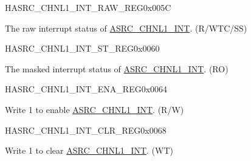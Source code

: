 \begin{register}{H}{ASRC\_CHNL1\_INT\_RAW\_REG}{0x005C}\label{regdesc:ASRCCHNL1INTRAWREG}
%
%
\regnewline%
\begin{regdesc}\begin{reglist}
\label{fielddesc:ASRCCHNL1OUTCNTEOFINTRAW}\item [ASRC\_CHNL1\_OUTCNT\_EOF\_INT\_RAW] The raw interrupt status of \hyperref[int:ASRCCHNL1INT] {ASRC\_CHNL1\_INT}. (R/WTC/SS)
\end{reglist}\end{regdesc}
\end{register}


\begin{register}{H}{ASRC\_CHNL1\_INT\_ST\_REG}{0x0060}\label{regdesc:ASRCCHNL1INTSTREG}
%
%
\regnewline%
\begin{regdesc}\begin{reglist}
\label{fielddesc:ASRCCHNL1OUTCNTEOFINTST}\item [ASRC\_CHNL1\_OUTCNT\_EOF\_INT\_ST] The masked interrupt status of \hyperref[int:ASRCCHNL1INT] {ASRC\_CHNL1\_INT}. (RO)
\end{reglist}\end{regdesc}
\end{register}


\begin{register}{H}{ASRC\_CHNL1\_INT\_ENA\_REG}{0x0064}\label{regdesc:ASRCCHNL1INTENAREG}
%
%
\regnewline%
\begin{regdesc}\begin{reglist}
\label{fielddesc:ASRCCHNL1OUTCNTEOFINTENA}\item [ASRC\_CHNL1\_OUTCNT\_EOF\_INT\_ENA] Write 1 to enable \hyperref[int:ASRCCHNL1INT] {ASRC\_CHNL1\_INT}.  (R/W)
\end{reglist}\end{regdesc}
\end{register}


\begin{register}{H}{ASRC\_CHNL1\_INT\_CLR\_REG}{0x0068}\label{regdesc:ASRCCHNL1INTCLRREG}
%
%
\regnewline%
\begin{regdesc}\begin{reglist}
\label{fielddesc:ASRCCHNL1OUTCNTEOFINTCLR}\item [ASRC\_CHNL1\_OUTCNT\_EOF\_INT\_CLR] Write 1 to clear \hyperref[int:ASRCCHNL1INT] {ASRC\_CHNL1\_INT}.  (WT)
\end{reglist}\end{regdesc}
\end{register}


